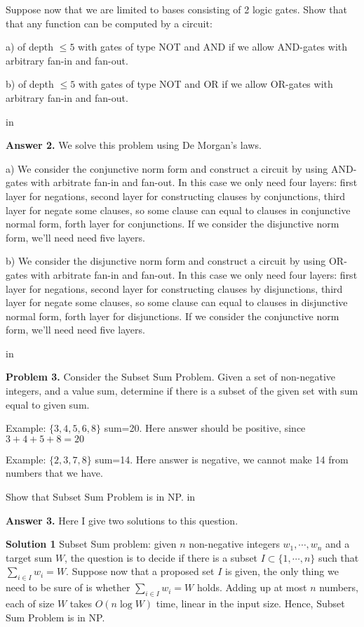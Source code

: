 \documentclass[11pt]{article}
\begin{document}
Suppose now that we are limited to bases consisting of 2 logic gates. Show that that any 
function can be computed by a circuit:

a) of depth $\leq5$ with gates of type NOT and AND if we allow AND-gates with arbitrary fan-in and fan-out.

b) of depth $\leq5$ with gates of type NOT and OR if we allow OR-gates with arbitrary fan-in and fan-out.

 in

{\bf Answer 2.} We solve this problem using De Morgan’s laws.

a) We consider the conjunctive norm form and construct a circuit by using AND-gates with arbitrate fan-in and fan-out. In this case we only need four layers: first layer for negations, second layer for constructing clauses by conjunctions, third layer for negate some clauses, so some clause can equal to clauses in conjunctive normal form, forth layer for conjunctions. If we consider the disjunctive norm form, we'll need need five layers.

b) We consider the disjunctive norm form and construct a circuit by using OR-gates with arbitrate fan-in and fan-out. In this case we only need four layers: first layer for negations, second layer for constructing clauses by disjunctions, third layer for negate some clauses, so some clause can equal to clauses in disjunctive normal form, forth layer for disjunctions. If we consider the conjunctive norm form, we'll need need five layers.
 
 in

{\bf Problem 3.} Consider the Subset Sum Problem. Given a set of non-negative integers, and a value sum, determine if there is a subset of the given set with sum equal to given sum.

Example: $\{3,4,5,6,8\}$ sum=20. Here answer should be positive, since $3+4+5+8=20$

Example: $\{2,3,7,8\}$ sum=14. Here answer is negative, we cannot make 14 from numbers 
that we have.

Show that Subset Sum Problem is in NP.
 in

{\bf Answer 3.} Here I give two solutions to this question.

\textbf{Solution 1} Subset Sum problem: given $n$ non-negative integers $w_1,\cdots,w_n$ and a target sum $W$, the question is to decide if there is a subset $I\subset\{1,\cdots,n\}$ such that $\sum_{i\in I}w_i=W$. Suppose now that a proposed set $I$ is given, the only thing we need to be sure of is whether $\sum_{i\in I}w_i=W$ holds. Adding up at most $n$
numbers, each of size $W$ takes $O(n\log W)$ time, linear in the input size. Hence, Subset Sum Problem is in NP.
\end{document}
